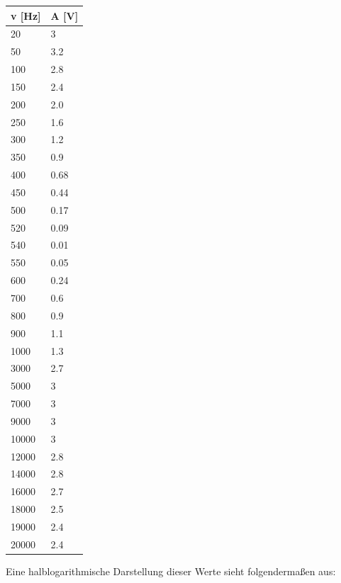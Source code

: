 \begin{minipage}{\linewidth}
    \begin{table}[H]
        \centering
    \begin{tabular}{ll}
        \toprule
        v [Hz]  & A [V] \\
        \midrule
        20     & 3    \\
        50     & 3.2  \\
        100    & 2.8  \\
        150    & 2.4  \\
        200    & 2.0  \\
        250    & 1.6  \\
        300    & 1.2  \\
        350    & 0.9  \\
        400    & 0.68 \\
        450    & 0.44 \\
        500    & 0.17 \\
        520    & 0.09 \\
        540    & 0.01 \\
        550    & 0.05 \\
        600    & 0.24 \\
        700    & 0.6  \\
        800    & 0.9  \\
        900    & 1.1  \\
        1000   & 1.3  \\
        3000   & 2.7  \\
        5000   & 3    \\
        7000   & 3    \\
        9000   & 3    \\
        10000  & 3    \\
        12000  & 2.8  \\
        14000  & 2.8  \\
        16000  & 2.7  \\
        18000  & 2.5  \\
        19000  & 2.4  \\
        20000  & 2.4  \\
        \bottomrule   
    \end{tabular}
\end{table}
\end{minipage}

Eine halblogarithmische Darstellung dieser Werte sieht folgendermaßen aus:

